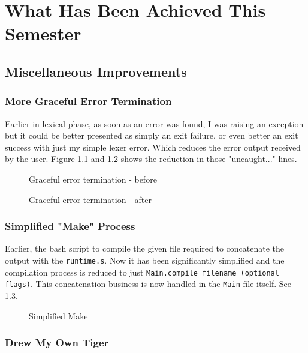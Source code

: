 \chapter{What Has Been Achieved This Semester}
\hspace{3mm}

\section{Miscellaneous Improvements}

\subsection{More Graceful Error Termination}

Earlier in lexical phase, as soon as an error was found, I was raising an exception but it could be better presented as simply an exit failure, or even better an exit success with just my simple lexer error. Which reduces the error output received by the user. Figure \ref{fig:gr1} and \ref{fig:gr2} shows the reduction in those "uncaught..." lines.

\begin{figure}
\centering
{}
\caption{Graceful error termination - before}
\label{fig:gr1}
\end{figure}
\begin{figure}
\centering
{}
\caption{Graceful error termination - after}
\label{fig:gr2}
\end{figure}

\subsection{Simplified "Make" Process}

Earlier, the bash script to compile the given file required to concatenate the output with the \texttt{runtime.s}. Now it has been significantly simplified and the compilation process is reduced to just \texttt{Main.compile filename (optional flags)}. This concatenation business is now handled in the \texttt{Main} file itself. See \ref{fig:sm}.

\begin{figure}
\centering
{}
\caption{Simplified Make}
\label{fig:sm}
\end{figure}

\subsection{Drew My Own Tiger}

